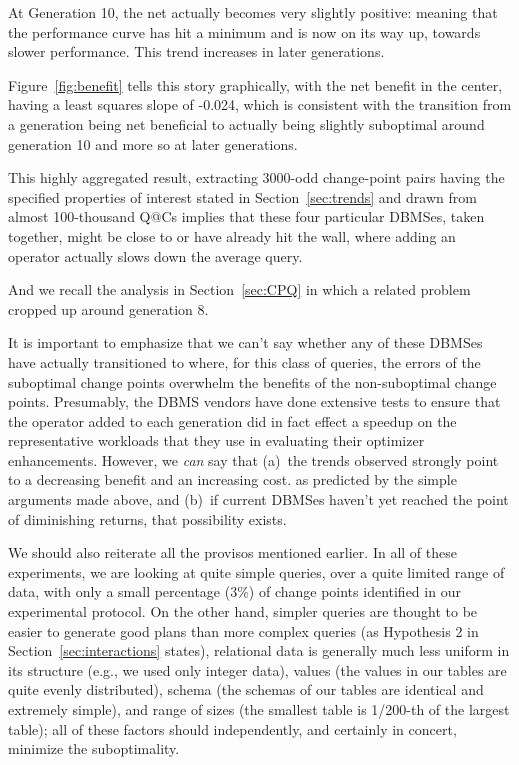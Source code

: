 \documentclass[prodmode,acmtods]{acmsmall}
\begin{document}
At Generation 10, the
net actually becomes very slightly positive: meaning that the performance
curve has hit a minimum and is now on its way up, towards slower
performance. This trend increases in later generations.

Figure~\ref{fig:benefit} tells this story graphically, with the net benefit
in the center, having a least squares slope of -0.024, which is consistent with the
transition from a generation being net beneficial to actually being slightly
suboptimal around generation 10 and more so at later generations.

This highly aggregated result, extracting 3000-odd change-point pairs having
the specified properties of interest stated in Section~\ref{sec:trends} and
drawn from almost \hbox{100-thousand} Q@Cs implies that these four particular
\hbox{DBMSes}, taken together, might be close to or have already hit the wall, where
adding an operator actually slows down the average query.

And we recall the analysis in Section~\ref{sec:CPQ} in which a related
problem cropped up around generation 8.

It is important to emphasize that we can't say whether any of these DBMSes have actually
transitioned to where, for this class of queries, the errors of the
suboptimal change points overwhelm the benefits of the non-suboptimal change
points. Presumably, the DBMS vendors have done extensive tests to ensure
that the operator added to each generation did in fact effect a speedup on
the representative workloads that they use in evaluating their optimizer
enhancements. However, we {\em can} say that (a)~the trends observed
strongly point to a decreasing benefit and an increasing cost. as predicted
by the simple arguments made above, and (b)~if current DBMSes haven't yet
reached the point of diminishing returns, that possibility exists.

We should also reiterate all the provisos mentioned earlier. In all of these
experiments, we are looking at
quite simple queries, over a quite limited range of data, with only a small
percentage (3\%) of change points identified in our experimental
protocol. On the other hand, simpler queries are thought to be easier to
generate good plans than more complex queries (as Hypothesis 2 in
Section~\ref{sec:interactions} states), relational data is generally much less uniform
in its structure (e.g., we used only integer data), values (the values in our
tables are quite evenly distributed), schema (the schemas of our tables
are identical and extremely simple), and range of sizes (the smallest table is 1/200-th of the
largest table); all of these factors should independently, and certainly in concert, minimize the suboptimality.
\end{document}
